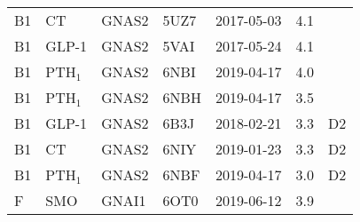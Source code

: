 \begin{table}[]
{\begin{tabular}{lllllrl}
   B1 &              CT  &     GNAS2 &   5UZ7 &       2017-05-03 &                4.1 &         \\
   B1 &           GLP-1  &     GNAS2 &   5VAI &       2017-05-24 &                4.1 &         \\
   B1 &            PTH$_1$  &     GNAS2 &   6NBI &       2019-04-17 &                4.0 &         \\
   B1 &            PTH$_1$  &     GNAS2 &   6NBH &       2019-04-17 &                3.5 &         \\
   B1 &           GLP-1  &     GNAS2 &   6B3J &       2018-02-21 &                3.3 &      D2 \\
   B1 &              CT  &     GNAS2 &   6NIY &       2019-01-23 &                3.3 &      D2 \\
   B1 &            PTH$_1$  &     GNAS2 &   6NBF &       2019-04-17 &                3.0 &      D2 \\
    F &              SMO &     GNAI1 &   6OT0 &       2019-06-12 &                3.9 &         \\
\bottomrule
\end{tabular}
 }
\end{table}
